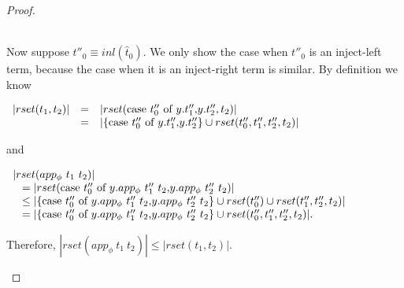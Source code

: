 \begin{proof}
\begin{itemize}
\begin{itemize}
    \ \\
    Now suppose $t''_0 \equiv inl(\hat{t}_0)$.  We only show the case when $t''_0$ is an
    inject-left term, because the case when it is an inject-right term is similar.  By
    definition we know 
    \begin{center}
      \begin{math}
        \begin{array}{lll}
          |rset(t_1,t_2)| & = & |rset(\mbox{case}\ t''_0\ \text{of}\ y\text{.}t''_1\text{,}y\text{.}t''_2, t_2)|\\
          & = & |\{\mbox{case}\ t''_0\ \text{of}\ y\text{.}t''_1\text{,}y\text{.}t''_2\} \cup rset(t''_0,t''_1,t''_2,t_2)|
        \end{array}
      \end{math}
    \end{center}
    and 
    \begin{center}
      \small
      \begin{math}
        \begin{array}{lll}
          |rset(app_\phi\ t_1\ t_2)| \\
          \,\,\,\,\,= |rset(\mbox{case}\ t''_0\ \text{of}\ y\text{.}app_\phi\ t''_1\ t_2\text{,}y\text{.}app_\phi\ t''_2\ t_2)|\\
          \,\,\,\,\,\leq |\{\mbox{case}\ t''_0\ \text{of}\ y\text{.}app_\phi\ t''_1\ t_2\text{,}y\text{.}app_\phi\ t''_2\ t_2\} \cup rset(t''_0) \cup rset(t''_1, t''_2, t_2)|\\
          \,\,\,\,\,= |\{\mbox{case}\ t''_0\ \text{of}\ y\text{.}app_\phi\ t''_1\ t_2\text{,}y\text{.}app_\phi\ t''_2\ t_2\} \cup rset(t''_0, t''_1, t''_2, t_2)|.
        \end{array}
      \end{math}
    \end{center}
    Therefore, $|rset(app_\phi\ t_1\ t_2)| \leq |rset(t_1,t_2)|$.
  \end{itemize}


\end{itemize}
\end{proof}
